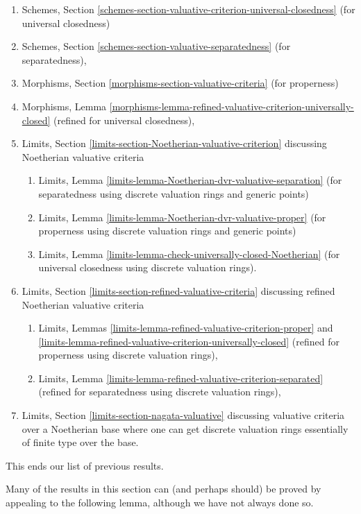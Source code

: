\begin{enumerate}
\item Schemes, Section
\ref{schemes-section-valuative-criterion-universal-closedness}
(for universal closedness)
\item Schemes, Section \ref{schemes-section-valuative-separatedness}
(for separatedness),
\item Morphisms, Section \ref{morphisms-section-valuative-criteria}
(for properness)
\item Morphisms, Lemma
\ref{morphisms-lemma-refined-valuative-criterion-universally-closed}
(refined for universal closedness),
\item Limits, Section \ref{limits-section-Noetherian-valuative-criterion}
discussing Noetherian valuative criteria
\begin{enumerate}
\item Limits, Lemma \ref{limits-lemma-Noetherian-dvr-valuative-separation}
(for separatedness using discrete valuation rings and generic points)
\item Limits, Lemma \ref{limits-lemma-Noetherian-dvr-valuative-proper}
(for properness using discrete valuation rings and generic points)
\item Limits, Lemma \ref{limits-lemma-check-universally-closed-Noetherian}
(for universal closedness using discrete valuation rings).
\end{enumerate}
\item Limits, Section \ref{limits-section-refined-valuative-criteria}
discussing refined Noetherian valuative criteria
\begin{enumerate}
\item Limits, Lemmas
\ref{limits-lemma-refined-valuative-criterion-proper} and
\ref{limits-lemma-refined-valuative-criterion-universally-closed}
(refined for properness using discrete valuation rings),
\item Limits, Lemma \ref{limits-lemma-refined-valuative-criterion-separated}
(refined for separatedness using discrete valuation rings),
\end{enumerate}
\item Limits, Section \ref{limits-section-nagata-valuative}
discussing valuative criteria over a Noetherian base where
one can get discrete valuation rings essentially of finite type
over the base.
\end{enumerate}
This ends our list of previous results.

\medskip\noindent
Many of the results in this section can (and perhaps should)
be proved by appealing to the following lemma, although we have not
always done so.

